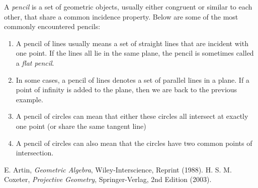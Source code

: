 \documentclass[12pt]{article}
\begin{document}
A \emph{pencil} is a set of geometric objects, usually either congruent or
similar to each other, that share a common incidence property. Below are some of the most commonly encountered pencils:
\begin{enumerate}
\item A pencil of lines usually means a set of straight lines that are incident with one point.  If the lines all lie in the same plane, the pencil is sometimes called a \emph{flat pencil}.
\item In some cases, a pencil of lines denotes a set of parallel lines in a plane.  If a point of infinity is added to the plane, then we are back to the previous example.
\item A pencil of circles can mean that either these circles all intersect at exactly one point (or share the same tangent line)
\item A pencil of circles can also mean that the circles have two common points of intersection.
\end{enumerate}

\begin{thebibliography}{8}
 E. Artin, {\em Geometric Algebra}, Wiley-Interscience, Reprint (1988).
 H. S. M. Coxeter, {\em Projective Geometry}, Springer-Verlag, 2nd Edition (2003).
\end{thebibliography}
\end{document}
